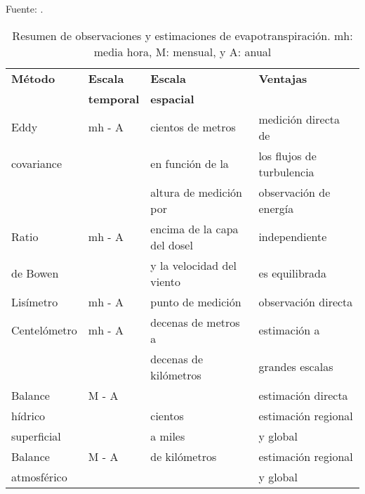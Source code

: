 
\begin{table}[ht!]
\caption{Resumen de observaciones y estimaciones de evapotranspiración. mh: media hora, M: mensual, y A: anual}
Fuente: \citet{wang2012review}.
\vspace{.2cm}
\label{tab:TableZhang01}
\centering
\begin{tabular}{l|l|l|l}
\hline
\textbf{Método} & \textbf{Escala}   & \textbf{Escala}             & \textbf{Ventajas}         \\
                & \textbf{temporal} & \textbf{espacial}           &                           \\ \hline
Eddy            & mh - A            & cientos de metros           & medición directa de       \\
covariance      &                   & en función de la            & los flujos de turbulencia \\
                &                   & altura de medición por      & observación de energía    \\ \cline{1-2}
Ratio           & mh - A            & encima de la capa del dosel & independiente             \\
de Bowen        &                   & y la velocidad del viento   & es equilibrada            \\ \hline
Lisímetro       & mh - A            & punto de medición           & observación directa       \\ \cline{1-3}
Centelómetro    & mh - A            & decenas de metros a         & estimación a              \\
                &                   & decenas de kilómetros       & grandes escalas           \\ \hline
Balance         & M - A             &                             & estimación directa        \\
hídrico         &                   & cientos                     & estimación regional       \\
superficial    &                   & a miles                     & y global                  \\ \cline{1-2} \cline{4-4} 
Balance         & M - A             & de kilómetros               & estimación regional       \\
atmosférico     &                   &                             & y global                  \\ \hline
\end{tabular}
\vspace{1.5cm}
\end{table}